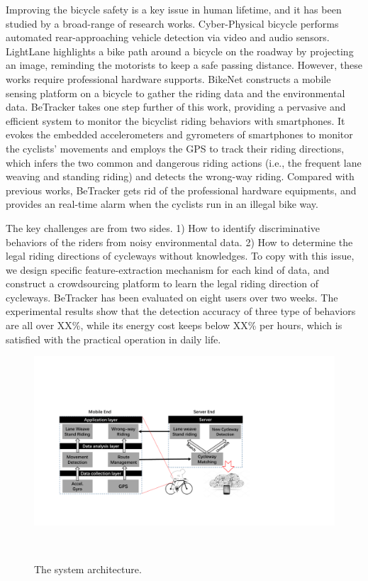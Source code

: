 \documentclass{sigchi-ext}
\def\sysname{BeTracker }
\def\ie{i.e., }
\begin{document}
Improving the bicycle safety is a key issue in human lifetime, and it has been studied by a broad-range of research works. Cyber-Physical bicycle \cite{Bib:imp2010} performs automated rear-approaching vehicle detection via video and audio sensors. LightLane \cite{bib:Lig2014} highlights a bike path around a bicycle on the roadway by projecting an image, reminding the motorists to keep a safe passing distance. However, these works require professional hardware supports.  BikeNet \cite{Bib:Bik2009} constructs a mobile sensing platform on a bicycle to gather the riding data and the environmental data. \sysname takes one step further of this work,  providing a pervasive and efficient system to monitor the bicyclist riding behaviors with smartphones. It evokes the embedded accelerometers and gyrometers of smartphones to monitor the cyclists' movements and employs the GPS to track their riding directions, which infers the two common and dangerous riding actions (\ie the frequent lane weaving and standing riding) and detects the wrong-way riding.  
Compared with previous works, \sysname gets rid of the professional hardware equipments, and provides an real-time alarm when the cyclists run in an illegal bike way. 

The key challenges are from two sides. 1) How to identify discriminative behaviors of the riders from noisy environmental data. 2) How to determine the legal riding directions of cycleways without knowledges.   
To copy with this issue, we design specific feature-extraction mechanism for each kind of data, and construct a crowdsourcing platform to learn the legal riding direction of cycleways. 
\sysname has been evaluated on eight users over two weeks. The experimental results show that the detection accuracy of three type of behaviors are all over XX\%, while its energy cost keeps below XX\% per hours, which is satisfied with the practical operation in daily life.  

\begin{figure}
  \includegraphics[width=0.9\columnwidth]{figures/sys.pdf}
  \caption{The system architecture.}~\label{fig:sys}
\end{figure}
\end{document}
